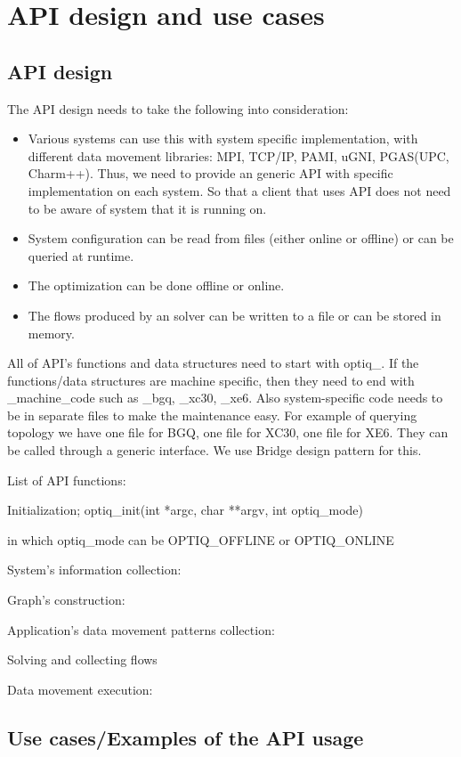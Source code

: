 \documentclass[letter]{article}
\begin{document}
\section{API design and use cases}
\subsection{API design}
The API design needs to take the following into consideration:

\begin{itemize}
	\item Various systems can use this with system specific implementation, with different data movement libraries: MPI, TCP/IP, PAMI, uGNI, PGAS(UPC, Charm++). Thus, we need to provide an generic API with specific implementation on each system. So that a client that uses API does not need to be aware of system that it is running on.
	\item System configuration can be read from files (either online or offline) or can be queried at runtime.
	\item The optimization can be done offline or online.
	\item The flows produced by an solver can be written to a file or can be stored in memory.
\end{itemize}

All of API's functions and data structures need to start with optiq\_. If the functions/data structures are machine specific, then they need to end with \_machine\_code such as \_bgq, \_xc30, \_xe6. Also system-specific code needs to be in separate files to make the maintenance easy. For example of querying topology we have one file for BGQ, one file for XC30, one file for XE6. They can be called through a generic interface. We use Bridge design pattern for this.

List of API functions:

Initialization;
optiq\_init(int *argc, char **argv, int optiq\_mode)

in which optiq\_mode can be OPTIQ\_OFFLINE or OPTIQ\_ONLINE

System's information collection:

Graph's construction:

Application's data movement patterns collection:

Solving and collecting flows

Data movement execution:


\subsection{Use cases/Examples of the API usage}
\end{document}
